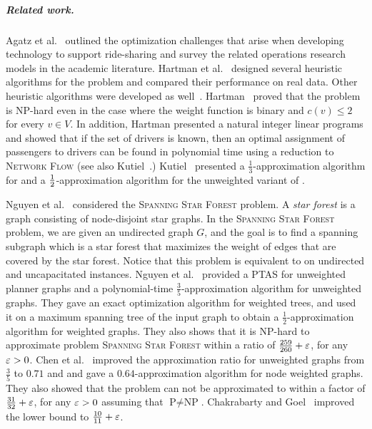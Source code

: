
\subparagraph{Related work.}
%
Agatz et al.~\cite{agatz2012optimization} outlined the optimization
challenges that arise when developing technology to support
ride-sharing and survey the related operations research models in the
academic literature.
%
Hartman et al.~\cite{hartman2014theory} designed
several heuristic algorithms for the \carpool problem and compared
their performance on real data.  Other heuristic algorithms were
developed as well~\cite{knapen2014exploiting}.
%
Hartman~\cite{hartman2013optimal} proved that the \carpool problem is
NP-hard even in the case where the weight function is binary and
$c(v) \leq 2$ for every $v \in V$.  In addition, Hartman presented a
natural integer linear programs and showed that if the set of drivers
is known, then an optimal assignment of passengers to drivers can be
found in polynomial time using a reduction to \textsc{Network Flow}
(see also Kutiel~\cite{kutiel2016}.)
%
Kutiel~\cite{kutiel2016} presented a $\frac{1}{3}$-approximation
algorithm for \carpool and a $\frac{1}{2}$-approximation algorithm for the
unweighted variant of \carpool.


Nguyen et al.~\cite{nguyen2008approximating} considered
the \textsc{Spanning Star Forest} problem.  A \emph{star forest} is a
graph consisting of node-disjoint star graphs.  In
the \textsc{Spanning Star Forest} problem, we are given an undirected
graph $G$, and the goal is to find a spanning subgraph which is a star
forest that maximizes the weight of edges that are covered by the star
forest.  Notice that this problem is equivalent to \carpool on
undirected and uncapacitated instances.
%
Nguyen et al.~\cite{nguyen2008approximating} provided a PTAS for
unweighted planner graphs and a polynomial-time
$\frac{3}{5}$-approximation algorithm for unweighted graphs.  They
gave an exact optimization algorithm for weighted trees, and used it
on a maximum spanning tree of the input graph to obtain a
$\frac{1}{2}$-approximation algorithm for weighted graphs.  They also
shows that it is NP-hard to approximate problem \textsc{Spanning Star
Forest} within a ratio of $\frac{259}{260}+\varepsilon$, for any $\varepsilon>0$.
%
%
Chen et al.~\cite{CENRRS13} improved the approximation ratio for unweighted
graphs from $\frac{3}{5}$ to $0.71$ and and gave a $0.64$-approximation
algorithm for node weighted graphs.
They also showed that the problem can not be approximated to within a factor of
$\frac{31}{32} + \varepsilon$, for any $\varepsilon > 0$ assuming that
$\text{P} \neq \text{NP}$.
%
Chakrabarty and Goel~\cite{ChakrabartyGoel10} improved the lower bound
to $\frac{10}{11} + \varepsilon$.

